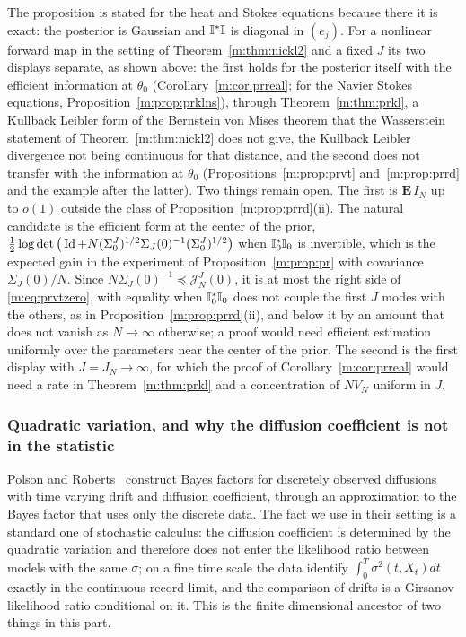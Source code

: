 \begin{remark}\label{m:rem:prscope}
The proposition is stated for the heat and Stokes equations because there it is exact: the posterior is Gaussian and $\mathbb{I}^*\mathbb{I}$ is diagonal in $(e_j)$. For a nonlinear forward map in the setting of Theorem~\ref{m:thm:nickl2} and a fixed $J$ its two displays separate, as shown above: the first holds for the posterior itself with the efficient information at $\theta_0$ (Corollary~\ref{m:cor:prreal}; for the Navier Stokes equations, Proposition~\ref{m:prop:prklns}), through Theorem~\ref{m:thm:prkl}, a Kullback Leibler form of the Bernstein von Mises theorem that the Wasserstein statement of Theorem~\ref{m:thm:nickl2} does not give, the Kullback Leibler divergence not being continuous for that distance, and the second does not transfer with the information at $\theta_0$ (Propositions~\ref{m:prop:prvt} and~\ref{m:prop:prrd} and the example after the latter). Two things remain open. The first is $\mathbf E\,I_N$ up to $o(1)$ outside the class of Proposition~\ref{m:prop:prrd}(ii). The natural candidate is the efficient form at the center of the prior, $\tfrac12\log\det\big(\operatorname{Id}+N(\Sigma^J_0)^{1/2}\Sigma_J(0)^{-1}(\Sigma^J_0)^{1/2}\big)$ when $\mathbb{I}^*_0\mathbb{I}_0$ is invertible, which is the expected gain in the experiment of Proposition~\ref{m:prop:pr} with covariance $\Sigma_J(0)/N$. Since $N\Sigma_J(0)^{-1}\preceq\mathcal J^J_N(0)$, it is at most the right side of \eqref{m:eq:prvtzero}, with equality when $\mathbb{I}^*_0\mathbb{I}_0$ does not couple the first $J$ modes with the others, as in Proposition~\ref{m:prop:prrd}(ii), and below it by an amount that does not vanish as $N\to\infty$ otherwise; a proof would need efficient estimation uniformly over the parameters near the center of the prior. The second is the first display with $J=J_N\to\infty$, for which the proof of Corollary~\ref{m:cor:prreal} would need a rate in Theorem~\ref{m:thm:prkl} and a concentration of $NV_N$ uniform in $J$.
\end{remark}

\subsubsection{Quadratic variation, and why the diffusion coefficient is not in the statistic} Polson and Roberts~\cite{polsonroberts1994} construct Bayes factors for discretely observed diffusions with time varying drift and diffusion coefficient, through an approximation to the Bayes factor that uses only the discrete data. The fact we use in their setting is a standard one of stochastic calculus: the diffusion coefficient is determined by the quadratic variation and therefore does not enter the likelihood ratio between models with the same $\sigma$; on a fine time scale the data identify $\int_0^T\sigma^2(t,X_t)dt$ exactly in the continuous record limit, and the comparison of drifts is a Girsanov likelihood ratio conditional on it. This is the finite dimensional ancestor of two things in this part.

